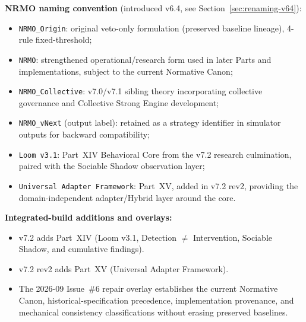 \noindent
\textbf{NRMO naming convention} (introduced v6.4, see
Section~\ref{sec:renaming-v64}):
\begin{itemize}
\item \texttt{NRMO\_Origin}: original veto-only formulation
  (preserved baseline lineage), 4-rule fixed-threshold;
\item \texttt{NRMO}: strengthened operational/research form used in later
  Parts and implementations, subject to the current Normative Canon;
\item \texttt{NRMO\_Collective}: v7.0/v7.1 sibling theory incorporating
  collective governance and Collective Strong Engine development;
\item \texttt{NRMO\_vNext} (output label): retained as a strategy
  identifier in simulator outputs for backward compatibility;
\item \texttt{Loom v3.1}: Part~XIV Behavioral Core from the v7.2 research
  culmination, paired with the Sociable Shadow observation layer;
\item \texttt{Universal Adapter Framework}: Part~XV, added in v7.2 rev2,
  providing the domain-independent adapter/Hybrid layer around the core.
\end{itemize}

\bigskip

\noindent
\textbf{Integrated-build additions and overlays:}
\begin{itemize}
\item v7.2 adds Part~XIV (Loom v3.1, Detection $\neq$ Intervention,
Sociable Shadow, and cumulative findings).
\item v7.2 rev2 adds Part~XV (Universal Adapter Framework).
\item The 2026-09 Issue~\#6 repair overlay establishes the current Normative
Canon, historical-specification precedence, implementation provenance, and
mechanical consistency classifications without erasing preserved baselines.
\end{itemize}
